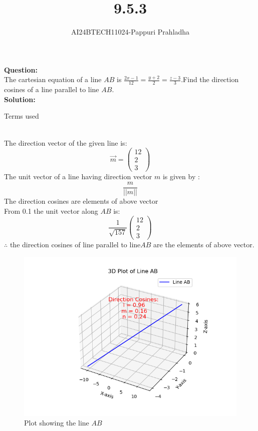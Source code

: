 \documentclass[journal]{IEEEtran}
\begin{document}

\vspace{3cm}

\title{9.5.3}
\author{AI24BTECH11024-Pappuri Prahladha}
{\let\newpage\relax\maketitle}

\renewcommand{\thefigure}{\theenumi}
\renewcommand{\thetable}{\theenumi}
\setlength{\intextsep}{10pt} %


\renewcommand{\thetable}{\theenumi}


\textbf{Question:}\\
The cartesian equation of a line $AB$ is $\frac{2x-1}{12}=\frac{y+2}{2}=\frac{z-3}{3}$.Find the direction cosines of a line parallel to line $AB$.
\\
\textbf{Solution: }\\
\begin{table}[h!]
    \renewcommand{\thetable}{1}
    \centering
    
    \caption{Terms used}
    \label{TABLE 1:}
\end{table}\\
The direction vector of the given line is$\colon$
\begin{equation*}
    \vec{m}=\begin{pmatrix}
        12\\
        2\\
        3
    \end{pmatrix}
\end{equation*}
The unit vector of a line having direction vector $m$ is given by $\colon$
\begin{equation}
    \frac{m}{||m||}
\end{equation}
The direction cosines are elements of above vector  \\
From 0.1 the unit vector along $AB$ is$\colon$\\
\begin{equation}
\frac{1}{\sqrt{157}}\begin{pmatrix}
    12\\
    2\\
    3
\end{pmatrix}
\end{equation}
$\therefore$ the direction cosines of line parallel to line$AB$ are the elements of above vector.
 \begin{figure}[h!]
   \centering
   \includegraphics[width=0.7\linewidth]{figs/figure1.png}
   \caption{Plot showing the line $AB$}
   \label{stemplot}
\end{figure}
\end{document}
